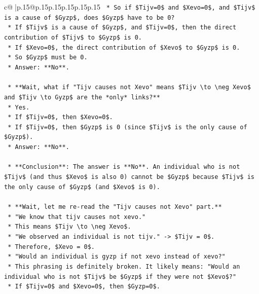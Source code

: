 \documentclass{article}
\begin{document}
{\begin{supertabular}{c@{$\;$}|p{.15\linewidth}@{}p{.15\linewidth}p{.15\linewidth}p{.15\linewidth}p{.15\linewidth}p{.15\linewidth}}
{{{\texttt{        *   So if \$Tijv=0\$ and \$Xevo=0\$, and \$Tijv\$ is a cause of \$Gyzp\$, does \$Gyzp\$ have to be 0?} \\
\texttt{        *   If \$Tijv\$ is a cause of \$Gyzp\$, and \$Tijv=0\$, then the direct contribution of \$Tijv\$ to \$Gyzp\$ is 0.} \\
\texttt{        *   If \$Xevo=0\$, the direct contribution of \$Xevo\$ to \$Gyzp\$ is 0.} \\
\texttt{        *   So \$Gyzp\$ must be 0.} \\
\texttt{        *   Answer: **No**.} \\
\\ 
\texttt{    *   **Wait, what if "Tijv causes not Xevo" means \$Tijv \textbackslash{}to \textbackslash{}neg Xevo\$ and \$Tijv \textbackslash{}to Gyzp\$ are the *only* links?**} \\
\texttt{        *   Yes.} \\
\texttt{        *   If \$Tijv=0\$, then \$Xevo=0\$.} \\
\texttt{        *   If \$Tijv=0\$, then \$Gyzp\$ is 0 (since \$Tijv\$ is the only cause of \$Gyzp\$).} \\
\texttt{        *   Answer: **No**.} \\
\\ 
\texttt{    *   **Conclusion**: The answer is **No**. An individual who is not \$Tijv\$ (and thus \$Xevo\$ is also 0) cannot be \$Gyzp\$ because \$Tijv\$ is the only cause of \$Gyzp\$ (and \$Xevo\$ is 0).} \\
\\ 
\texttt{    *   **Wait, let me re{-}read the "Tijv causes not Xevo" part.**} \\
\texttt{        *   "We know that tijv causes not xevo."} \\
\texttt{        *   This means \$Tijv \textbackslash{}to \textbackslash{}neg Xevo\$.} \\
\texttt{        *   "We observed an individual is not tijv." {-}> \$Tijv = 0\$.} \\
\texttt{        *   Therefore, \$Xevo = 0\$.} \\
\texttt{        *   "Would an individual is gyzp if not xevo instead of xevo?"} \\
\texttt{        *   This phrasing is definitely broken. It likely means: "Would an individual who is not \$Tijv\$ be \$Gyzp\$ if they were not \$Xevo\$?"} \\
\texttt{        *   If \$Tijv=0\$ and \$Xevo=0\$, then \$Gyzp=0\$.} \\
}}}
\end{supertabular}}
\end{document}
